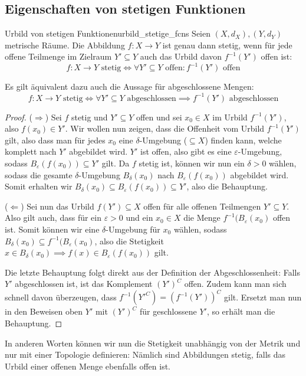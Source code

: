 \subsection{Eigenschaften von stetigen Funktionen}
\begin{satz}{Urbild von stetigen Funktionen}{urbild_stetige_fcns}
Seien $(X, d_X), (Y, d_Y)$ metrische Räume. Die Abbildung $f: X \to Y$ ist genau dann stetig, wenn für jede offene Teilmenge im Zielraum $Y' \subseteq Y$ auch das Urbild davon $f^{-1}(Y')$ offen ist:
$$f: X \to Y \text{ stetig} \iff \forall Y' \subseteq Y \text{ offen}: f^{-1}(Y') \text{ offen}$$

Es gilt äquivalent dazu auch die Aussage für abgeschlossene Mengen:
$$f: X \to Y \text{ stetig} \iff \forall Y' \subseteq Y \text{ abgeschlossen} \implies f^{-1}(Y') \text{ abgeschlossen}$$
\end{satz}
\begin{proof}
($\Longrightarrow$) Sei $f$ stetig und $Y' \subseteq Y$ offen und sei $x_0 \in X$ im Urbild $f^{-1}(Y')$, also $f(x_0) \in Y'$. Wir wollen nun zeigen, dass die Offenheit vom Urbild $f^{-1}(Y')$ gilt, also dass man für jedes $x_0$ eine $\delta$-Umgebung ($\subseteq X$) finden kann, welche komplett nach $Y'$ abgebildet wird. $Y'$ ist offen, also gibt es eine $\varepsilon$-Umgebung, sodass $B_\varepsilon(f(x_0)) \subseteq Y'$ gilt. Da $f$ stetig ist, können wir nun ein $\delta > 0$ wählen, sodass die gesamte $\delta$-Umgebung $B_\delta(x_0)$ nach $B_\varepsilon(f(x_0))$ abgebildet wird. Somit erhalten wir $B_\delta(x_0) \subseteq B_\varepsilon(f(x_0)) \subseteq Y'$, also die Behauptung.

($\Longleftarrow$) Sei nun das Urbild $f(Y') \subseteq X$ offen für alle offenen Teilmengen $Y' \subseteq Y$. Also gilt auch, dass für ein $\varepsilon > 0$ und ein $x_0 \in X$ die Menge $f^{-1}(B_\varepsilon(x_0)$ offen ist. Somit können wir eine $\delta$-Umgebung für $x_0$ wählen, sodass $B_\delta(x_0) \subseteq f^{-1}(B_\varepsilon(x_0)$, also die Stetigkeit $x \in B_\delta(x_0) \implies f(x) \in B_\varepsilon(f(x_0))$ gilt.

Die letzte Behauptung folgt direkt aus der Definition der Abgeschlossenheit: Falls $Y'$ abgeschlossen ist, ist das Komplement $(Y')^C$ offen. Zudem kann man sich schnell davon überzeugen, dass $f^{-1}(Y'^C) = (f^{-1}(Y'))^C$ gilt. Ersetzt man nun in den Beweisen oben $Y'$ mit $(Y')^C$ für geschlossene $Y'$, so erhält man die Behauptung.
\end{proof}

In anderen Worten können wir nun die Stetigkeit unabhängig von der Metrik und nur mit einer Topologie definieren: Nämlich sind Abbildungen stetig, falls das Urbild einer offenen Menge ebenfalls offen ist.

